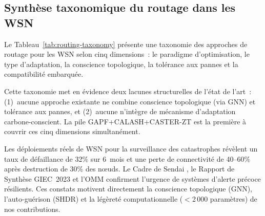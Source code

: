 \subsection{Synthèse taxonomique du routage dans les WSN}

Le Tableau~\ref{tab:routing-taxonomy} présente une taxonomie des approches de routage pour les WSN selon cinq dimensions~: le paradigme d'optimisation, le type d'adaptation, la conscience topologique, la tolérance aux pannes et la compatibilité embarquée.

\begin{table}[htbp]
\centering
\caption{Taxonomie des approches de routage pour les WSN selon cinq dimensions.}
\label{tab:routing-taxonomy}
\end{table}

Cette taxonomie met en évidence deux lacunes structurelles de l'état de l'art~: (1)~aucune approche existante ne combine conscience topologique (via GNN) et tolérance aux pannes, et (2)~aucune n'intègre de mécanisme d'adaptation carbone-conscient. La pile GAPF+CALASH+CASTER-ZT est la première à couvrir ces cinq dimensions simultanément.

Les déploiements réels de WSN pour la surveillance des catastrophes \cite{Aslan2012ForestFireWSN,AbuGhazaleh2007WSNSurvivability} révèlent un taux de défaillance de 32\% sur 6~mois et une perte de connectivité de 40--60\% après destruction de 30\% des n\oe{}uds. Le Cadre de Sendai \cite{UNDRR2015Sendai}, le Rapport de Synthèse GIEC~2023 \cite{IPCC2021AR6,IPCC2023SYR} et l'OMM \cite{wmo2025climate} confirment l'urgence de systèmes d'alerte précoce résilients. Ces constats motivent directement la conscience topologique (GNN), l'auto-guérison (SHDR) et la légèreté computationnelle ($<$2\,000 paramètres) de nos contributions.


